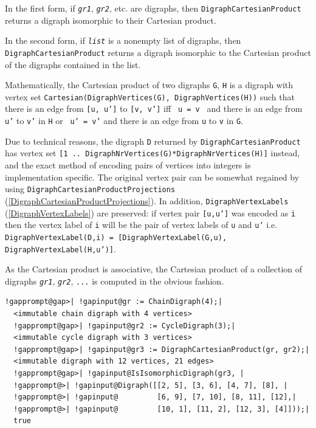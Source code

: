 \documentclass[a4paper,11pt]{report}
\begin{document}
{{{ In the first form, if \mbox{\texttt{\mdseries\slshape gr1}}, \mbox{\texttt{\mdseries\slshape gr2}}, etc. are digraphs, then \texttt{DigraphCartesianProduct} returns a digraph isomorphic to their Cartesian product. 

 In the second form, if \mbox{\texttt{\mdseries\slshape list}} is a non\texttt{}empty list of digraphs, then \texttt{DigraphCartesianProduct} returns a digraph isomorphic to the Cartesian product of the digraphs
contained in the list. 

 Mathematically, the Cartesian product of two digraphs \texttt{G}, \texttt{H} is a digraph with vertex set \texttt{Cartesian(DigraphVertices(G), DigraphVertices(H))} such that there is an edge from \texttt{[u, u']} to \texttt{[v, v']} iff \texttt{ u = v } and there is an edge from \texttt{u'} to \texttt{v'} in \texttt{H} or \texttt{ u' = v'} and there is an edge from \texttt{u} to \texttt{v} in \texttt{G}. 

 Due to technical reasons, the digraph \texttt{D} returned by \texttt{DigraphCartesianProduct} has vertex set \texttt{[1 .. DigraphNrVertices(G)*DigraphNrVertices(H)]} instead, and the exact method of encoding pairs of vertices into integers is
implementation specific. The original vertex pair can be somewhat regained by
using \texttt{DigraphCartesianProductProjections} (\ref{DigraphCartesianProductProjections}). In addition, \texttt{DigraphVertexLabels} (\ref{DigraphVertexLabels}) are preserved: if vertex pair \texttt{[u,u']} was encoded as \texttt{i} then the vertex label of \texttt{i} will be the pair of vertex labels of \texttt{u} and \texttt{u'} i.e. \texttt{DigraphVertexLabel(D,i) = [DigraphVertexLabel(G,u), DigraphVertexLabel(H,u')]}. 

 As the Cartesian product is associative, the Cartesian product of a collection
of digraphs \mbox{\texttt{\mdseries\slshape gr1}}, \mbox{\texttt{\mdseries\slshape gr2}}, \texttt{...} is computed in the obvious fashion. 

 
\begin{Verbatim}[commandchars=!@|,fontsize=\small,frame=single,label=Example]
  !gapprompt@gap>| !gapinput@gr := ChainDigraph(4);|
  <immutable chain digraph with 4 vertices>
  !gapprompt@gap>| !gapinput@gr2 := CycleDigraph(3);|
  <immutable cycle digraph with 3 vertices>
  !gapprompt@gap>| !gapinput@gr3 := DigraphCartesianProduct(gr, gr2);|
  <immutable digraph with 12 vertices, 21 edges>
  !gapprompt@gap>| !gapinput@IsIsomorphicDigraph(gr3, |
  !gapprompt@>| !gapinput@Digraph([[2, 5], [3, 6], [4, 7], [8], |
  !gapprompt@>| !gapinput@         [6, 9], [7, 10], [8, 11], [12],|
  !gapprompt@>| !gapinput@         [10, 1], [11, 2], [12, 3], [4]]));|
  true
\end{Verbatim}
 }

}}
\end{document}
